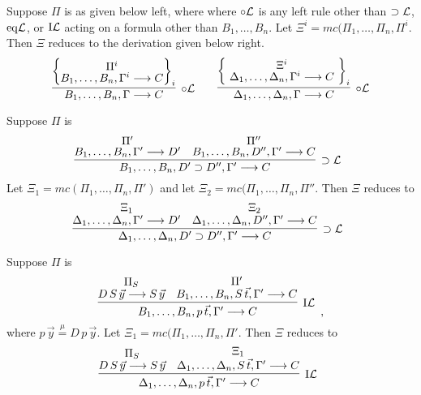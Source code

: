 \documentclass[preprint]{elsarticle}
\newcommand{\Seq}[2]{#1\longrightarrow #2}
\newcommand{\circL}{\circ{\cal L}}
\newcommand{\defmu}{\stackrel{\mu}{=}}
\newcommand{\eqL}{{\rm eq}{\cal L}}
\newcommand{\indL}{{\rm I}{\cal L}}
\newcommand{\oimpL}{\oimp{\cal L}}
\newcommand{\oimp}{\supset}
\begin{document}
\begin{trivlist}

\item[\fbox{$-/\circL$}] Suppose $\Pi$ is as given below left, where 
  where $\circL$ is any left rule other than $\oimpL$, $\eqL$, or
  $\indL$ acting on a formula other than $B_1, \ldots, B_n$.
  Let $\Xi^i = mc(\Pi_1,\ldots,\Pi_n,\Pi^i$.
  Then $\Xi$ reduces to the derivation given below right. 
  \begin{displaymath}
    \infer[\circL]{\Seq{B_1,\ldots,B_n,\Gamma}{C}}
    {\left\{\raisebox{-1.5ex}{\deduce{\Seq{B_1,\ldots,B_n,\Gamma^i}{C}}
          {\Pi^i}}\right\}_i}
    \qquad
    \infer[\circL]
          {\Seq{\Delta_1,\ldots,\Delta_n,\Gamma}{C}}
          {
            \left\{
            \raisebox{-1.3ex}{
              \deduce{\Seq{\Delta_1,\ldots,\Delta_n,\Gamma^i}{C}}{\Xi^i}
            }
            \right\}_i
          }
  \end{displaymath}



\item[\fbox{$-/\oimpL$}] Suppose $\Pi$ is
  \begin{displaymath}
    \infer[\oimpL]{\Seq{B_1,\ldots,B_n, D' \oimp D'',\Gamma'}{C}}
    {\deduce{\Seq{B_1,\ldots,B_n,\Gamma'}{D'}}
      {\Pi'}
      & \deduce{\Seq{B_1,\ldots,B_n,D'',\Gamma'}{C}}
      {\Pi''}}
    \enspace 
  \end{displaymath}
  Let $\Xi_1 = mc(\Pi_1,\ldots,\Pi_n,\Pi')$ and let
  $\Xi_2 = mc(\Pi_1,\ldots,\Pi_n,\Pi''$.
  Then $\Xi$ reduces to
  \begin{displaymath}
    \infer[\oimpL]{\Seq{\Delta_1,\ldots,\Delta_n,D' \oimp D'',\Gamma'}{C}}
    {\deduce{\Seq{\Delta_1,\ldots,\Delta_n,\Gamma'}{D'}}
      {\Xi_1}
      & \deduce{\Seq{\Delta_1,\ldots,\Delta_n,D'',\Gamma'}{C}}
      {\Xi_2}}
    \enspace 
  \end{displaymath}




\item[\fbox{$-/\indL$}] Suppose $\Pi$ is 
$$
\infer[\indL] {\Seq{B_1,\dots,B_n, p\,\vec{t},\Gamma'} {C}} {
  \deduce{\Seq{D\,S\,\vec{y}}{S\,\vec{y}}}{\Pi_S} &
  \deduce{\Seq{B_1,\dots,B_n, S\,\vec{t}, \Gamma'}{C}}{\Pi'} }
\enspace ,
$$      
where $p\,\vec{y} \defmu D\,p\,\vec{y}$.  
Let $\Xi_1 = mc(\Pi_1,\ldots,\Pi_n,\Pi'$. 
Then $\Xi$ reduces to
$$
\infer[\indL] {\Seq{\Delta_1,\dots,\Delta_n, p\,\vec{t},\Gamma'}{C}} {
  \deduce{\Seq{D\,S\,\vec{y}}{S\,\vec{y}}}{\Pi_S} &
  \deduce{\Seq{\Delta_1,\dots,\Delta_n, S\,\vec{t}, \Gamma'}{C}}{\Xi_1}
} \enspace 
$$      



\end{trivlist}
\end{document}
